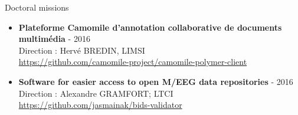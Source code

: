 \begin{frame}{Doctoral missions}

\begin{itemize}
\item
\textbf{
Plateforme Camomile d'annotation collaborative de documents multim\'edia} - 2016 \\
Direction : Herv\'e BREDIN, LIMSI \\
{\small
\color{blue}
\url{https://github.com/camomile-project/camomile-polymer-client}}
\item
\textbf{Software for easier access to open M/EEG data repositories} - 2016 \\ 
Direction : Alexandre GRAMFORT; LTCI
{\color{blue} \url{https://github.com/jasmainak/bids-validator}}
\end{itemize}
\end{frame}

